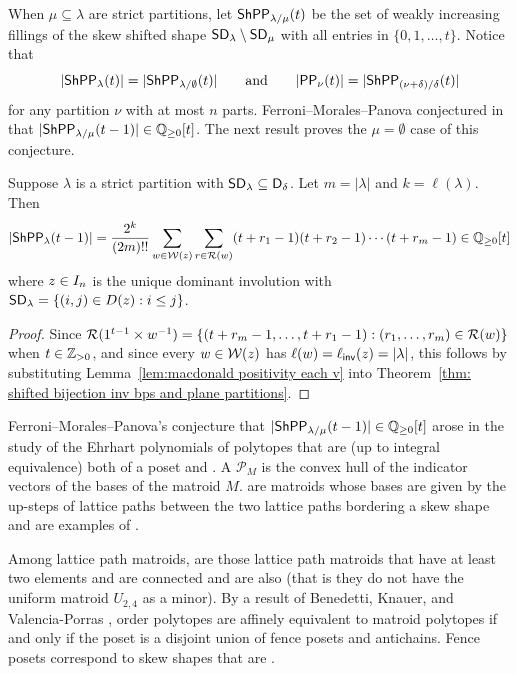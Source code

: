 \documentclass[10pt]{article}
\begin{document}
When $\mu\subseteq \lambda$ are strict partitions,   let $\mathsf{ShPP}_{\lambda/\mu}(t)$ be the set of weakly increasing fillings of the skew shifted shape $\mathsf{SD}_\lambda\setminus \mathsf{SD}_\mu$ with all entries in $\{0,1,\ldots,t\}$. 
Notice that 
\[|\mathsf{ShPP}_{\lambda}(t)| = |\mathsf{ShPP}_{\lambda/\emptyset}(t)|
\qquad\text{and}\qquad |\mathsf{PP}_{\nu}(t)| = |\mathsf{ShPP}_{(\nu+\delta)/\delta}(t)|\] for any partition $\nu$ with at most $n$ parts.
Ferroni--Morales--Panova conjectured in \cite[Conj.~7.10]{FMP} that 
$|\mathsf{ShPP}_{\lambda/\mu}(t-1)| \in \mathbb{Q}_{\geq 0}[t]$. The next result proves the $\mu=\emptyset$ case of this conjecture.


\begin{theorem}\label{fmp-thm}
	Suppose $\lambda$ is a strict partition with $\mathsf{SD}_\lambda \subseteq \mathsf{D}_\delta$. Let $m=|\lambda|$ and $k = \ell(\lambda)$.
    Then
		$$|\mathsf{ShPP}_{\lambda}(t-1)| = \frac{2^{k}}{(2m)!!} \sum_{w\in \mathcal{W}(z)} \sum_{r \in \mathcal{R}(w)} (t+r_1-1)(t+r_2-1)\cdots (t+r_m-1) \in \mathbb{Q}_{\geq 0}[t]
		$$
where $z \in I_n$ is the unique dominant involution with $\mathsf{SD}_\lambda = \{ (i,j) \in D(z) : i\leq j\}$.
\end{theorem}



\begin{proof}
Since $\mathcal{R}(1^{t-1}\times w^{-1}) = \{ (t+r_m-1,\dots,t+r_1-1) : (r_1,\dots,r_m) \in \mathcal{R}(w)\}$
when $t \in \mathbb{Z}_{>0}$, and since every $w \in \mathcal{W}(z)$ has $\ell(w) = \ell_{\mathsf{inv}}(z) = |\lambda|$,
this follows by substituting Lemma~\ref{lem:macdonald positivity each v} into Theorem~\ref{thm: shifted bijection inv bps and plane partitions}.
\end{proof}


Ferroni--Morales--Panova's conjecture that 
$|\mathsf{ShPP}_{\lambda/\mu}(t-1)| \in \mathbb{Q}_{\geq 0}[t]$ arose in the study of the Ehrhart polynomials of polytopes that are (up to integral equivalence) both  of a poset and  . A  $\mathcal{P}_M$ is the convex hull of the indicator vectors of the bases of the matroid $M$.  are matroids whose bases are given by the up-steps of lattice paths between 
the two lattice paths bordering a skew shape and are examples of . 

Among lattice path matroids,  are those lattice path matroids that have at least two elements and are connected and are also  (that is they do not have the uniform matroid $U_{2,4}$ as a minor).  By a result of Benedetti, Knauer, and Valencia-Porras \cite[Thm.~1.1]{BKV-P}, order polytopes are affinely equivalent to  matroid polytopes if and only if the poset is a disjoint union of fence posets and antichains. Fence posets correspond to skew shapes that are . 
\end{document}
